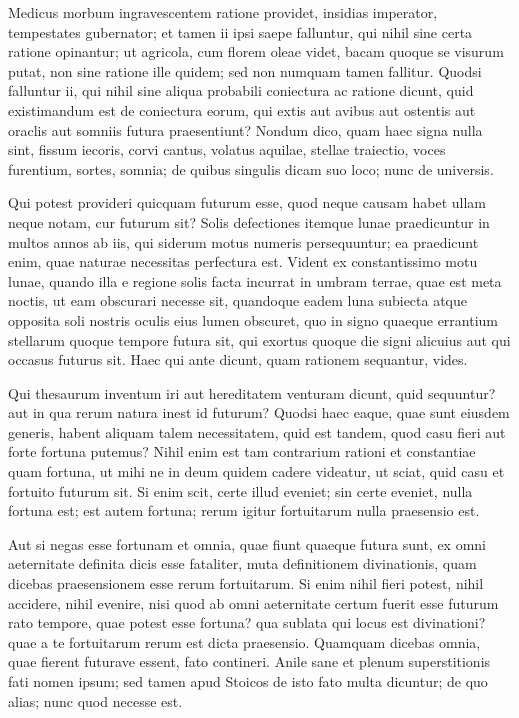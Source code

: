  Medicus morbum ingravescentem ratione providet, insidias imperator, tempestates gubernator; et tamen ii ipsi saepe falluntur, qui nihil sine certa ratione opinantur; ut agricola, cum florem oleae videt, bacam quoque se visurum putat, non sine ratione ille quidem; sed non numquam tamen fallitur. Quodsi falluntur ii, qui nihil sine aliqua probabili coniectura ac ratione dicunt, quid existimandum est de coniectura eorum, qui extis aut avibus aut ostentis aut oraclis aut somniis futura praesentiunt? Nondum dico, quam haec signa nulla sint, fissum iecoris, corvi cantus, volatus aquilae, stellae traiectio, voces furentium, sortes, somnia; de quibus singulis dicam suo loco; nunc de universis.

 Qui potest provideri quicquam futurum esse, quod neque causam habet ullam neque notam, cur futurum sit? Solis defectiones itemque lunae praedicuntur in multos annos ab iis, qui siderum motus numeris persequuntur; ea praedicunt enim, quae naturae necessitas perfectura est. Vident ex constantissimo motu lunae, quando illa e regione solis facta incurrat in umbram terrae, quae est meta noctis, ut eam obscurari necesse sit, quandoque eadem luna subiecta atque opposita soli nostris oculis eius lumen obscuret, quo in signo quaeque errantium stellarum quoque tempore futura sit, qui exortus quoque die signi alicuius aut qui occasus futurus sit. Haec qui ante dicunt, quam rationem sequantur, vides.

 Qui thesaurum inventum iri aut hereditatem venturam dicunt, quid sequuntur? aut in qua rerum natura inest id futurum? Quodsi haec eaque, quae sunt eiusdem generis, habent aliquam talem necessitatem, quid est tandem, quod casu fieri aut forte fortuna putemus? Nihil enim est tam contrarium rationi et constantiae quam fortuna, ut mihi ne in deum quidem cadere videatur, ut sciat, quid casu et fortuito futurum sit. Si enim scit, certe illud eveniet; sin certe eveniet, nulla fortuna est; est autem fortuna; rerum igitur fortuitarum nulla praesensio est.

 Aut si negas esse fortunam et omnia, quae fiunt quaeque futura sunt, ex omni aeternitate definita dicis esse fataliter, muta definitionem divinationis, quam dicebas praesensionem esse rerum fortuitarum. Si enim nihil fieri potest, nihil accidere, nihil evenire, nisi quod ab omni aeternitate certum fuerit esse futurum rato tempore, quae potest esse fortuna? qua sublata qui locus est divinationi? quae a te fortuitarum rerum est dicta praesensio. Quamquam dicebas omnia, quae fierent futurave essent, fato contineri. Anile sane et plenum superstitionis fati nomen ipsum; sed tamen apud Stoicos de isto fato multa dicuntur; de quo alias; nunc quod necesse est.

